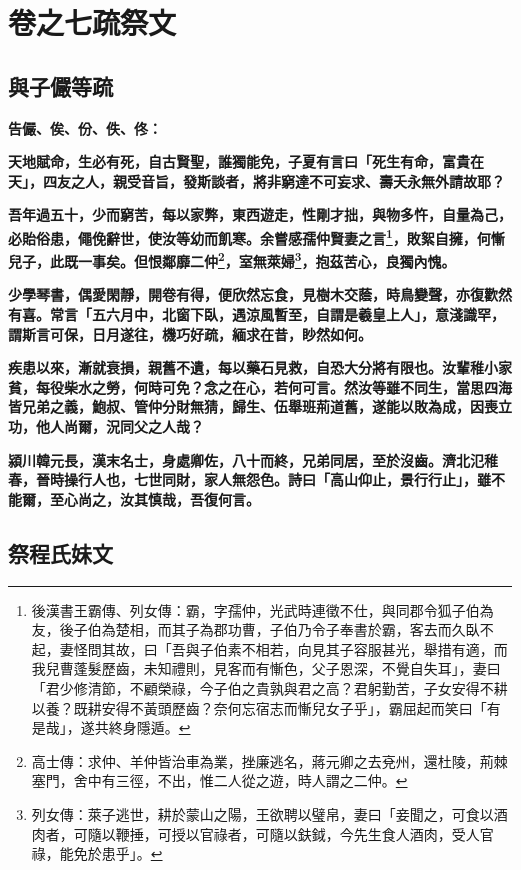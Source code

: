 \chapter{卷之七\hspace{1ex}疏祭文}

\section{與子儼等疏}

\textbf{告儼、俟、份、佚、佟：}

\textbf{天地賦命，生必有死，自古賢聖，誰獨能免，子夏有言曰「死生有命，富貴在天」，四友之人，親受音旨，發斯談者，將非窮達不可妄求、壽夭永無外請故耶？}

\textbf{吾年過五十，少而窮苦，每以家弊，東西遊走，性剛才拙，與物多忤，自量為己，必貽俗患，僶俛辭世，使汝等幼而飢寒。余嘗感孺仲賢妻之言\footnote{後漢書王霸傳、列女傳：霸，字孺仲，光武時連徵不仕，與同郡令狐子伯為友，後子伯為楚相，而其子為郡功曹，子伯乃令子奉書於霸，客去而久臥不起，妻怪問其故，曰「吾與子伯素不相若，向見其子容服甚光，舉措有適，而我兒曹蓬髮歷齒，未知禮則，見客而有慚色，父子恩深，不覺自失耳」，妻曰「君少修清節，不顧榮祿，今子伯之貴孰與君之高？君躬勤苦，子女安得不耕以養？既耕安得不黃頭歷齒？奈何忘宿志而慚兒女子乎」，霸屈起而笑曰「有是哉」，遂共終身隱遁。}，敗絮自擁，何慚兒子，此既一事矣。但恨鄰靡二仲\footnote{高士傳：求仲、羊仲皆治車為業，挫廉逃名，蔣元卿之去兗州，還杜陵，荊棘塞門，舍中有三徑，不出，惟二人從之遊，時人謂之二仲。}，室無萊婦\footnote{列女傳：萊子逃世，耕於蒙山之陽，王欲聘以璧帛，妻曰「妾聞之，可食以酒肉者，可隨以鞭捶，可授以官祿者，可隨以鈇鉞，今先生食人酒肉，受人官祿，能免於患乎」。}，抱茲苦心，良獨內愧。}

\textbf{少學琴書，偶愛閑靜，開卷有得，便欣然忘食，見樹木交蔭，時鳥變聲，亦復歡然有喜。常言「五六月中，北窗下臥，遇涼風暫至，自謂是羲皇上人」，意淺識罕，謂斯言可保，日月遂往，機巧好疏，緬求在昔，眇然如何。}

\textbf{疾患以來，漸就衰損，親舊不遺，每以藥石見救，自恐大分將有限也。汝輩稚小家貧，每役柴水之勞，何時可免？念之在心，若何可言。然汝等雖不同生，當思四海皆兄弟之義，鮑叔、管仲分財無猜，歸生、伍舉班荊道舊，遂能以敗為成，因喪立功，他人尚爾，況同父之人哉？}

\textbf{潁川韓元長，漢末名士，身處卿佐，八十而終，兄弟同居，至於沒齒。濟北氾稚春，晉時操行人也，七世同財，家人無怨色。詩曰「高山仰止，景行行止」，雖不能爾，至心尚之，汝其慎哉，吾復何言。}

\section{祭程氏妹文}

